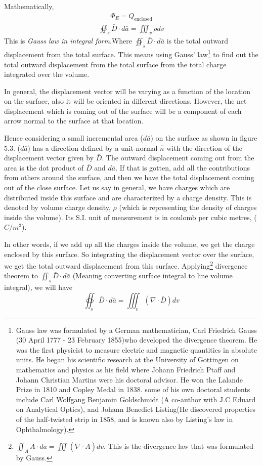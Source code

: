 Mathematically, 
\begin{align}
\Phi_E = Q_{\text{enclosed}}
\end{align}
\begin{align}
\boxed{\oiint_s\bar{D}\cdot{d\bar{a}} = \iiint_v\rho dv}
\end{align}
This is \emph{Gauss law in integral form}.Where $\oiint_s\bar{D}\cdot d\bar{a}$ is the total outward displacement from the total surface. This means using Gauss' law\footnote[5]{
Gauss law was formulated by a German mathematician, Carl Friedrich Gauss (30 April 1777 - 23 February 1855)who developed the divergence theorem. He was the first physicist to measure electric and magnetic quantities in absolute units. He began his scientific research at the University of Gottingen on mathematics and physics as his field where Johann Friedrich Ptaff and Johann Christian Martins were his doctoral advisor. He won the Lalande Prize in 1810 and Copley Medal in 1838. some of his own doctoral students include Carl Wolfgang Benjamin Goldschmidt (A co-author with J.C Eduard on Analytical Optics), and Johann Benedict Listing(He discovered properties of the half-twisted strip in 1858, and is known also by Listing's law in Ophthalmology).
} to find out the total outward displacement from the total surface from the total charge integrated over the volume.

In general, the displacement vector will be varying as a function of the location on the surface, also it will be oriented in different directions. However, the net displacement which is coming out of the surface will be a component of each arrow normal to the surface at that location.

Hence considering a small incremental area ($ d\bar{a} $) on the surface as shown in figure 5.3. ($ d\bar{a} $) has a direction defined by a unit normal $ \hat{n} $ with the direction of the displacement vector given by $ \bar{D} $. The outward displacement coming out from the area is the dot product of $ \bar{D} $ and $ d\bar{a} $. If that is gotten, add all the contributions from others around the surface, and then we have the total displacement coming out of the close surface. Let us say in general, we have charges which are distributed inside this surface and are characterized by a charge density. This is denoted by volume charge density, $ \rho $ (which is representing the density of charges inside the volume). Its S.I. unit of measurement is in coulomb per cubic metres, ($ C/m^{3} $).

In other words, if we add up all the charges inside the volume, we get the charge enclosed by this surface. So integrating the displacement vector over the surface, we get the total outward displacement from this surface. 
Applying\footnote[6]{
$	\iint_A A\cdot d\bar{a} = \iiint (\nabla\cdot \bar{A})dv $. This is the divergence law that was formulated by Gauss.
} divergence theorem to $\iint_s\bar{D}\cdot d\bar{a}$ (Meaning converting surface integral to line volume integral), we will have 
\begin{equation*}
\oiint_s\bar{D} \cdot d\bar{a} = \iiint_v(\nabla\cdot \bar{D})dv
\end{equation*}



